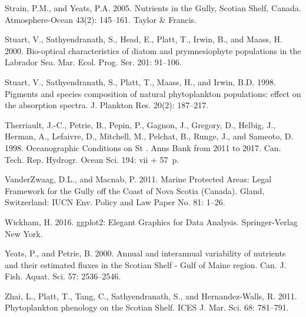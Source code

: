 \documentclass[12pt]{article}\usepackage[]{graphicx}\usepackage[]{color}
\begin{document}
\begin{CSLReferences}{1}{0}
%
Strain, P.M., and Yeats, P.A. 2005. {Nutrients in the Gully, Scotian Shelf, Canada}. Atmosphere-Ocean 43(2): 145--161. Taylor \& Francis.

%
Stuart, V., Sathyendranath, S., Head, E., Platt, T., Irwin, B., and Maass, H. 2000. {Bio-optical characteristics of diatom and prymnesiophyte populations in the Labrador Sea}. Mar. Ecol. Prog. Ser. 201: 91--106.

%
Stuart, V., Sathyendranath, S., Platt, T., Maass, H., and Irwin, B.D. 1998. {Pigments and species composition of natural phytoplankton populations: effect on the absorption spectra}. J. Plankton Res. 20(2): 187--217.

%
Therriault, J.-C., Petrie, B., Pepin, P., Gagnon, J., Gregory, D., Helbig, J., Herman, A., Lefaivre, D., Mitchell, M., Pelchat, B., Runge, J., and Sameoto, D. 1998. {Oceanographic Conditions on St . Anns Bank from 2011 to 2017}. Can. Tech. Rep. Hydrogr. Ocean Sci. 194: vii + 57~p.

%
VanderZwaag, D.L., and Macnab, P. 2011. {Marine Protected Areas: Legal Framework for the Gully off the Coast of Nova Scotia (Canada)}. Gland, Switzerland: IUCN Env. Policy and Law Paper No. 81: 1--26.

%
Wickham, H. 2016. {ggplot2: Elegant Graphics for Data Analysis}. Springer-Verlag New York.

%
Yeats, P., and Petrie, B. 2000. {Annual and interannual variability of nutrients and their estimated fluxes in the Scotian Shelf - Gulf of Maine region}. Can. J. Fish. Aquat. Sci. 57: 2536--2546.

%
Zhai, L., Platt, T., Tang, C., Sathyendranath, S., and Hernandez-Walls, R. 2011. {Phytoplankton phenology on the Scotian Shelf}. ICES J. Mar. Sci. 68: 781--791.

\end{CSLReferences}
\clearpage
\end{document}
